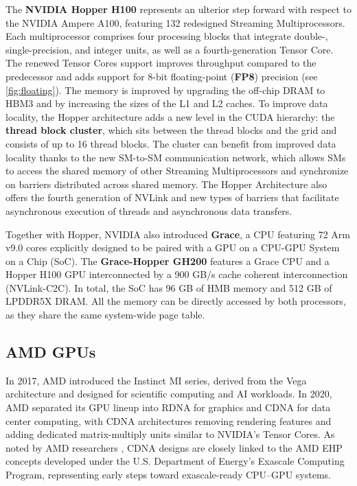 The \textbf{NVIDIA Hopper H100} \cite{Choquette2023} represents an ulterior step forward with respect to the NVIDIA Ampere A100, featuring 132 redesigned Streaming Multiprocessors. Each multiprocessor comprises four processing blocks that integrate double-, single-precision, and integer units, as well as a fourth-generation Tensor Core.
The renewed Tensor Cores support improves throughput compared to the predecessor and adds support for 8-bit floating-point (\textbf{FP8}) precision (see \ref{fig:floating}).
The memory is improved by upgrading the off-chip DRAM to HBM3 and by increasing the sizes of the L1 and L2 caches.
To improve data locality, the Hopper architecture adds a new level in the CUDA hierarchy: the \textbf{thread block cluster}, which sits between the thread blocks and the grid and consists of up to 16 thread blocks. The cluster can benefit from improved data locality thanks to the new SM-to-SM communication network, which allows SMs to access the shared memory of other Streaming Multiprocessors and synchronize on barriers distributed across shared memory.
The Hopper Architecture also offers the fourth generation of NVLink and new types of barriers that facilitate asynchronous execution of threads and asynchronous data transfers.

Together with Hopper, NVIDIA also introduced \textbf{Grace}, a CPU featuring 72 Arm v9.0 cores explicitly designed to be paired with a GPU on a CPU-GPU System on a Chip (SoC). 
The \textbf{Grace-Hopper GH200} features a Grace CPU and a Hopper H100 GPU interconnected by a 900 GB/s cache coherent interconnection (NVLink-C2C). In total, the SoC has 96 GB of HMB memory and 512 GB of LPDDR5X DRAM. All the memory can be directly accessed by both processors, as they share the same system-wide page table.

\subsection{AMD GPUs}

In 2017, AMD introduced the Instinct MI series, derived from the Vega architecture and designed for scientific computing and AI workloads. In 2020, AMD separated its GPU lineup into RDNA for graphics and CDNA for data center computing, with CDNA architectures removing rendering features and adding dedicated matrix-multiply units similar to NVIDIA’s Tensor Cores. As noted by AMD researchers \cite{Loh2023}\cite{Smith2024}, CDNA designs are closely linked to the AMD EHP concepts developed under the U.S. Department of Energy’s Exascale Computing Program, representing early steps toward exascale-ready CPU–GPU systems.

